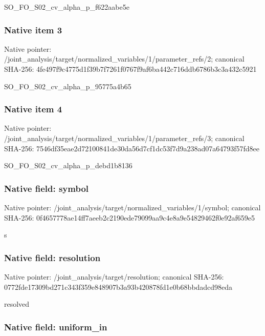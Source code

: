 \documentclass[10pt,a4paper]{article}
\begin{document}
SO\_FO\_S02\_cv\_alpha\_p\_f622aabe5e


\subsubsection{Native item 3}


Native pointer: /joint\_analysis/target/n\allowbreak{}ormalized\_variables/1/pa\allowbreak{}rameter\_refs/2; canonical SHA-256: 4fe497f9c4775d1f39b7f726\allowbreak{}1f0767f9af6ba442c716ddb6\allowbreak{}786b3c3a432c5921


SO\_FO\_S02\_cv\_alpha\_p\_95775a4b65


\subsubsection{Native item 4}


Native pointer: /joint\_analysis/target/n\allowbreak{}ormalized\_variables/1/pa\allowbreak{}rameter\_refs/3; canonical SHA-256: 7546df35eae2d72100841de3\allowbreak{}0da56d7cf1dc53f7d9a238ad\allowbreak{}07a64793f57fd8ee


SO\_FO\_S02\_cv\_alpha\_p\_debd1b8136


\subsubsection{Native field: symbol}


Native pointer: /joint\_analysis/target/n\allowbreak{}ormalized\_variables/1/sy\allowbreak{}mbol; canonical SHA-256: 0f4657778ae14ff7aeeb2c21\allowbreak{}90ede79099aa9c4e8a9e5482\allowbreak{}9462f0e92af659e5


s


\subsubsection{Native field: resolution}


Native pointer: /joint\_analysis/target/resolution; canonical SHA-256: 0772fde17309bd271c343f35\allowbreak{}9e848907b3a93b420878fd1e\allowbreak{}0b68bbdadcd98eda


resolved


\subsubsection{Native field: uniform\_in}
\end{document}

